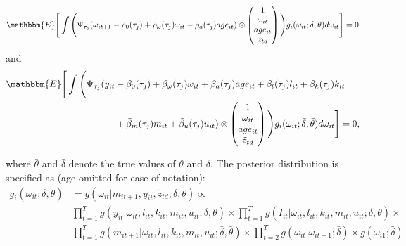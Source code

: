 \documentclass{article}
\begin{document}
\begin{equation}\label{omegaimc}
\mathbbm{E}\Bigg[\int\Bigg(\Psi_{\tau_{j}}(\omega_{it+1}-\bar{\rho}_{0}(\tau_{j})+\bar{\rho}_{\omega}(\tau_{j})\omega_{it}-\bar{\rho}_{a}(\tau_{j})age_{it})\otimes
\begin{pmatrix}
1 \\
\omega_{it}\\
age_{it}\\
\tilde{z}_{td}
\end{pmatrix}
\Bigg)g_{i}(\omega_{it};\bar{\delta},\bar{\theta})d\omega_{it}\Bigg]=0
\end{equation}
and 
\begin{equation}\label{yimc}
\begin{split}
\mathbbm{E}\Bigg[\int\Bigg(\Psi_{\tau_{j}}(y_{it}&-\bar{\beta}_{0}(\tau_{j})+\bar{\beta}_{\omega}(\tau_{j})\omega_{it}+\bar{\beta}_{a}(\tau_{j})age_{it}+\bar{\beta}_{l}(\tau_{j})l_{it}+\bar{\beta}_{k}(\tau_{j})k_{it}\\
&+\bar{\beta}_{m}(\tau_{j})m_{it}+\bar{\beta}_{u}(\tau_{j})u_{it})\otimes
\begin{pmatrix}
1 \\
\omega_{it}\\
age_{it}\\
\tilde{z}_{td}
\end{pmatrix}
\Bigg)g_{i}(\omega_{it};\bar{\delta},\bar{\theta})d\omega_{it}\Bigg]=0,
\end{split}
\end{equation}

where $\bar{\theta}$ and $\bar{\delta}$ denote the true values of $\theta$ and $\delta$. The posterior distribution is specified as (age omitted for ease of notation):
\begin{equation}\label{posterior}
\begin{split}
g_{i}(\omega_{it};\bar{\delta},\bar{\theta})&=g(\omega_{it}|m_{it+1}, y_{it}, \tilde{z}_{td}; \bar{\delta},\bar{\theta}) \propto\\
&\prod_{t=1}^{T}g(y_{it}|\omega_{it}, l_{it}, k_{it}, m_{it}, u_{it};\bar{\delta},\bar{\theta})\times
\prod_{t=1}^{T}g(I_{it}|\omega_{it}, l_{it}, k_{it}, m_{it}, u_{it};\bar{\delta},\bar{\theta})\times\\
&\prod_{t=1}^{T}g(m_{it+1}|\omega_{it}, l_{it}, k_{it}, m_{it}, u_{it};\bar{\delta},\bar{\theta})\times \prod_{t=2}^{T}g(\omega_{it}|\omega_{it-1};\bar{\delta})\times g(\omega_{i1};\bar{\delta})
\end{split}
\end{equation}
\end{document}

